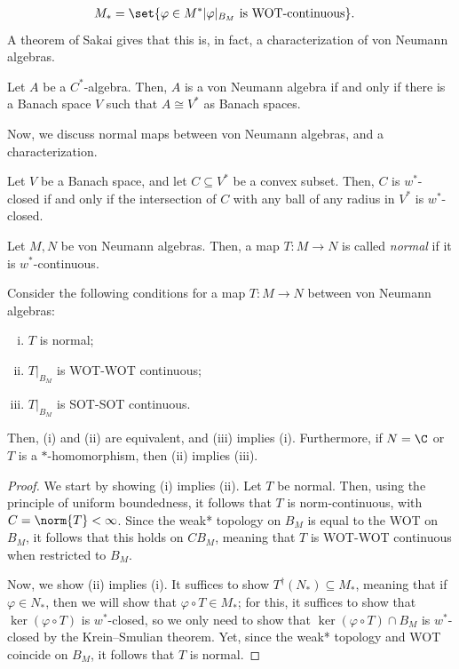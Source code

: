 \documentclass[10pt]{mypackage}
\begin{document}
\begin{align*}
  M_{\ast} &= \set{\varphi\in M^{\ast} | \varphi|_{B_M}\text{ is WOT-continuous}}.
\end{align*}
A theorem of Sakai gives that this is, in fact, a characterization of von Neumann algebras.
\begin{theorem}[Sakai]
  Let $A$ be a $C^{\ast}$-algebra. Then, $A$ is a von Neumann algebra if and only if there is a Banach space $V$ such that $A\cong V^{\ast}$ as Banach spaces. 
\end{theorem}
Now, we discuss normal maps between von Neumann algebras, and a characterization.
\begin{theorem}
  Let $V$ be a Banach space, and let $C\subseteq V^{\ast}$ be a convex subset. Then, $C$ is $w^{\ast}$-closed if and only if the intersection of $C$ with any ball of any radius in $V^{\ast}$ is $w^{\ast}$-closed.
\end{theorem}
\begin{definition}
  Let $M,N$ be von Neumann algebras. Then, a map $T\colon M\rightarrow N$ is called \textit{normal} if it is $w^{\ast}$-continuous.
\end{definition}
\begin{theorem}
  Consider the following conditions for a map $T\colon M\rightarrow N$ between von Neumann algebras:
  \begin{enumerate}[(i)]
    \item $T$ is normal;
    \item $T|_{B_M}$ is WOT-WOT continuous;
    \item $T|_{B_M}$ is SOT-SOT continuous.
  \end{enumerate}
  Then, (i) and (ii) are equivalent, and (iii) implies (i). Furthermore, if $N = \C$ or $T$ is a $\ast$-homomorphism, then (ii) implies (iii).
\end{theorem}
\begin{proof}
  We start by showing (i) implies (ii). Let $T$ be normal. Then, using the principle of uniform boundedness, it follows that $T$ is norm-continuous, with $C = \norm{T} < \infty$. Since the weak* topology on $B_M$ is equal to the WOT on $B_M$, it follows that this holds on $CB_M$, meaning that $T$ is WOT-WOT continuous when restricted to $B_M$.

  Now, we show (ii) implies (i). It suffices to show $T^{\dag}\left( N_{\ast} \right)\subseteq M_{\ast}$, meaning that if $\varphi\in N_{\ast}$, then we will show that $\varphi\circ T\in M_{\ast}$; for this, it suffices to show that $\ker\left( \varphi\circ T \right)$ is $w^{\ast}$-closed, so we only need to show that $\ker\left( \varphi\circ T \right)\cap B_M$ is $w^{\ast}$-closed by the Krein--Smulian theorem. Yet, since the weak* topology and WOT coincide on $B_M$, it follows that $T$ is normal.
\end{proof}
\end{document}
